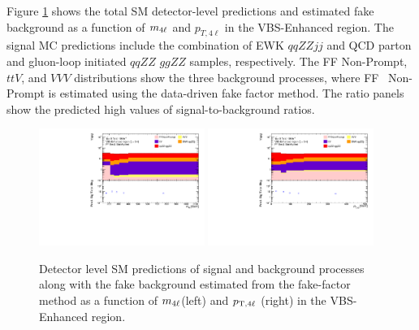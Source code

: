 Figure \ref{fig:MCFFRedStack} shows the total SM detector-level predictions and estimated fake background as a function of $m_{4\ell}$ and $p_{T,4\ell}$ in the VBS-Enhanced region. The signal MC predictions include the combination of EWK $qqZZjj$ and QCD parton and gluon-loop initiated $qqZZ$ $ggZZ$ samples, respectively. The FF Non-Prompt, $ttV$, and $VVV$ distributions show the three background processes, where FF ~Non-Prompt is estimated using the data-driven fake factor method. The ratio panels show the predicted high values of signal-to-background ratios. 

\begin{figure}[htb]
    \centering
    \includegraphics[width=0.48\textwidth]{figures/Analysis/Background/RedStack_VBSEnhanced_M4l.pdf}
    \includegraphics[width=0.48\textwidth]{figures/Analysis/Background/RedStack_VBSEnhanced_Pt4l.pdf}
    \caption{ Detector level SM predictions of signal and background processes along with the fake background estimated from the fake-factor method as a function of $m_{4\ell}$(left) and $p_{\textrm{T} ,4\ell}$ (right) in the VBS-Enhanced region. \label{fig:MCFFRedStack} }
\end{figure}
